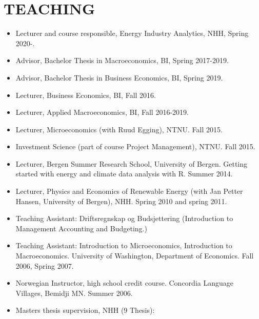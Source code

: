 \documentclass[margin]{res}
\begin{document}
\section{TEACHING}
\begin{itemize}
\setlength{\itemsep}{10pt}
\item[] Lecturer and course responsible, Energy Industry Analytics, NHH, Spring 2020-.
\item[] Advisor, Bachelor Thesis in Macroeconomics, BI, Spring 2017-2019.
\item[] Advisor, Bachelor Thesis in Business Economics, BI, Spring 2019.
\item[] Lecturer, Business Economics, BI, Fall 2016.
\item[] Lecturer, Applied Macroeconomics, BI, Fall 2016-2019.
\item[] Lecturer, Microeconomics (with Ruud Egging), NTNU.  Fall 2015.
\item[] Investment Science (part of course Project Management), NTNU.  Fall 2015.
\item[] Lecturer, Bergen Summer Research School, University of Bergen.  Getting started with energy and climate data analysis with R.  Summer 2014.
\item[] Lecturer, Physics and Economics of Renewable Energy (with Jan Petter Hansen, University of Bergen), NHH.  Spring 2010 and spring 2011.
\item[] Teaching Assistant: Driftsregnskap og Budsjettering (Introduction to Management Accounting and Budgeting.)
\item[] Teaching Assistant: Introduction to Microeconomics, Introduction to Macroeconomics.  University of Washington, Department of Economics. Fall 2006, Spring 2007.
\item[] Norwegian Instructor, high school credit course.  Concordia Language Villages, Bemidji MN.  Summer 2006.
\item [] Masters thesis supervision, NHH (9 Thesis):

\end{itemize}
\end{document}
